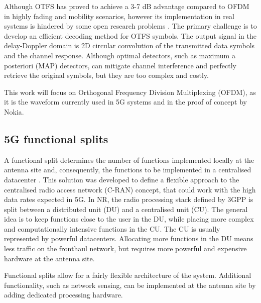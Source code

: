 	Although OTFS has proved to achieve a 3-7 dB advantage compared to OFDM in highly fading and mobility scenarios, however its implementation in real systems is hindered by some open research problems \cite{Wei_Yuan_OTFS_whitepaper_2021}. 
	The primary challenge is to develop an efficient decoding method for OTFS symbols.
	The output signal in the delay-Doppler domain is 2D circular convolution of the transmitted data symbols and the channel response. Although optimal detectors, such as maximum a posteriori (MAP) detectors, can mitigate channel interference and perfectly retrieve the original symbols, but they are too complex and costly.
	
	This work will focus on Orthogonal Frequency Division Multiplexing (OFDM), as it is the waveform currently used in 5G systems and in the proof of concept by Nokia. 
	
	 
	
	\subsection{5G functional splits}
	
	A functional split determines the number of functions implemented locally at the antenna site and, consequently, the functions to be implemented in a centralised datacenter \cite{Larsen_Checko_Christiansen_2019}. 
 	This solution was developed to define a flexible approach to the centralised radio access network (C-RAN) concept, that could work with the high data rates expected in 5G. 
	In NR, the radio processing stack defined by 3GPP is split between a distributed unit (DU) and a centralised unit (CU). 
	The general idea is to keep functions close to the user in the DU, while placing more complex and computationally intensive functions in the CU. The CU is usually represented by powerful datacenters.
	Allocating more functions in the DU means less traffic on the fronthaul network, but requires more powerful and expensive hardware at the antenna site.
	 
	Functional splits allow for a fairly flexible architecture of the system. Additional functionality, such as network sensing, can be implemented at the antenna site by adding dedicated processing hardware.


